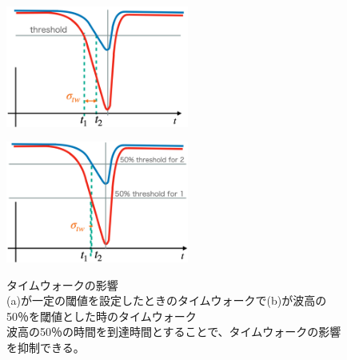 \begin{figure}[h]
    \begin{minipage}[b]{0.5\linewidth}
        \centering
        \includegraphics[width=6cm]{fig/ch3/TimeWalk.png}
        \label{fg:TimeWalk}
    \end{minipage}
    \begin{minipage}[b]{0.5\linewidth}
        \centering
        \includegraphics[width=6cm]{fig/ch3/TimeWalk_50.png}
        \label{fg:TimeWalk_50}
    \end{minipage}
    \caption[タイムウォークの影響]{タイムウォークの影響\\(a)が一定の閾値を設定したときのタイムウォークで(b)が波高の50％を閾値とした時のタイムウォーク\\波高の50％の時間を到達時間とすることで、タイムウォークの影響を抑制できる。}
\end{figure}


